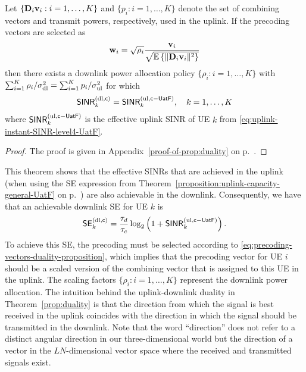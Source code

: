 \begin{theorem} \label{prop:duality}
	Let $\{\mathbf{D}_i{\bf v}_i: i=1,\ldots,K \}$ and $\{p_i: i=1,\ldots,K \}$  denote the set of combining vectors and transmit powers, respectively, used in the uplink. 
	If the precoding vectors are selected as
	\begin{equation} \label{eq:precoding-vectors-duality-proposition}
	\mathbf{w}_i = \sqrt{\rho_i} \frac{{\bf v}_{i}}{\sqrt{\mathbb{E} \left\{ \| \mathbf{D}_{i} {\mathbf{v}}_{i} \|^2 \right\} }} 
	\end{equation}
	then there exists a downlink power allocation policy $\{\rho_i:  i=1,\ldots,K\}$
	with $\sum_{i=1}^{K} \rho_i/\sigma^2_{\mathrm{dl}}=\sum_{i=1}^{K}p_i/\sigma^2_{\mathrm{ul}}$ for which 
	\begin{align}
	\mathsf{SINR}_{k}^{({\rm dl,\mathsf{c}})} = \mathsf{SINR}_{k}^{({\rm ul},\mathsf{c-UatF})},\quad k=1,\ldots,K
	\end{align}
	where $\mathsf{SINR}_{k}^{({\rm ul},\mathsf{c-UatF})}$ is the effective uplink SINR of UE $k$ from \eqref{eq:uplink-instant-SINR-level4-UatF}.
\end{theorem}
\begin{proof}
The proof is given in Appendix~\ref{proof-of-prop:duality} on p.~\pageref{proof-of-prop:duality}.
\end{proof}


This theorem shows that the effective SINRs that are achieved in the uplink (when using the SE expression from Theorem~\ref{proposition:uplink-capacity-general-UatF} on p.~\pageref{proposition:uplink-capacity-general-UatF}) are also achievable in the downlink. Consequently, we have that an achievable downlink SE for UE $k$ is
\begin{equation}
\mathsf{SE}_{k}^{({\rm dl,\mathsf{c}})} = \frac{\tau_d}{\tau_c} \log_2   \left( 1 + \mathsf{SINR}_{k}^{({\rm ul},\mathsf{c-UatF})}   \right).
\end{equation}
To achieve this SE, the precoding must be selected according to \eqref{eq:precoding-vectors-duality-proposition}, which implies that the precoding vector for UE $i$ should be a scaled version of the combining vector that is assigned to this UE in the uplink. The scaling factors $\{\rho_i:i=1,\ldots,K\}$ represent the downlink power allocation.
The intuition behind the uplink-downlink duality in Theorem~\ref{prop:duality} is that the direction from which the signal is best received in the uplink coincides with the direction in which the signal should be transmitted in the downlink. Note that the word ``direction'' does not refer to a distinct angular direction in our three-dimensional world but the direction of a vector in the $LN$-dimensional vector space where the received and transmitted signals exist.

